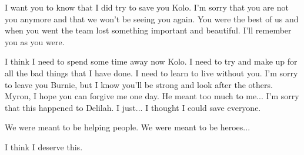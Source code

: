 I want you to know that I did try to save you Kolo. I'm sorry that you are not you anymore and that we won't be seeing you again. You were the best of us and when you went the team lost something important and beautiful. I'll remember you as you were.\medskip

I think I need to spend some time away now Kolo. I need to try and make up for all the bad things that I have done. I need to learn to live without you. I'm sorry to leave you Burnie, but I know you'll be strong and look after the others. Myron, I hope you can forgive me one day. He meant too much to me... I'm sorry that this happened to Delilah. I just... I thought I could save everyone.\medskip

We were meant to be helping people. We were meant to be heroes...\medskip

I think I deserve this.\medskip

\vspace*{5mm}

